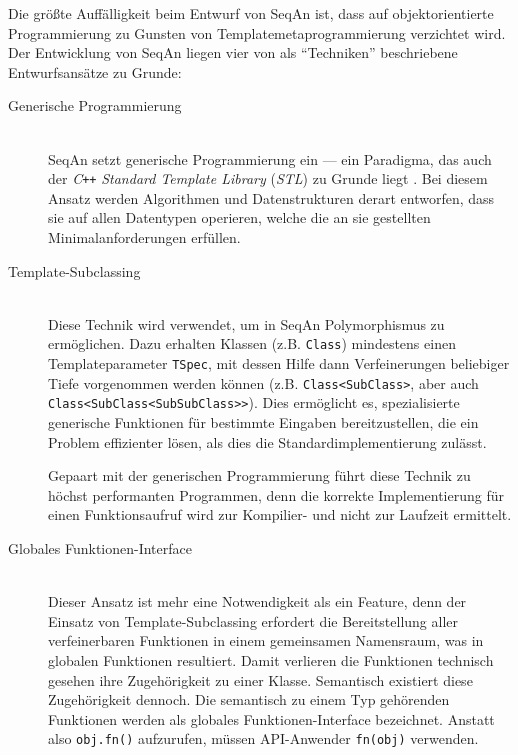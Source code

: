 Die größte Auffälligkeit beim Entwurf von SeqAn ist, dass auf objektorientierte Programmierung zu Gunsten von Templatemetaprogrammierung verzichtet wird. Der Entwicklung von SeqAn liegen vier von \cite{GogolDoring:2009vz} als ``Techniken'' beschriebene Entwurfsansätze zu Grunde:
\begin{description}
  \item[Generische Programmierung] \hfill \\
  SeqAn setzt generische Programmierung ein --- ein Paradigma, das auch der \textit{C{}}\verb!++! \textit{Standard Template Library} (\textit{STL}) zu Grunde liegt \citep{plauger2001c++}. Bei diesem Ansatz werden Algorithmen und Datenstrukturen derart entworfen, dass sie auf allen Datentypen operieren, welche die an sie gestellten Minimalanforderungen erfüllen.
  
  \item[Template-Subclassing] \hfill \\
  Diese Technik wird verwendet, um in SeqAn Polymorphismus zu ermöglichen. Dazu erhalten Klassen (z.B. \texttt{Class}) mindestens einen Templateparameter \texttt{TSpec}, mit dessen Hilfe dann Verfeinerungen beliebiger Tiefe vorgenommen werden können (z.B. \texttt{Class<SubClass>}, aber auch \texttt{Class<SubClass<SubSubClass>>}). Dies ermöglicht es, spezialisierte generische Funktionen für bestimmte Eingaben bereitzustellen, die ein Problem effizienter lösen, als dies die Standardimplementierung zulässt.
  
  Gepaart mit der generischen Programmierung führt diese Technik zu höchst performanten Programmen, denn die korrekte Implementierung für einen Funktionsaufruf wird zur Kompilier- und nicht zur Laufzeit ermittelt.
  
  \item[Globales Funktionen-Interface] \hfill \\
  Dieser Ansatz ist mehr eine Notwendigkeit als ein Feature, denn der Einsatz von Template-Subclassing erfordert die Bereitstellung aller verfeinerbaren Funktionen in einem gemeinsamen Namensraum, was in globalen Funktionen resultiert. Damit verlieren die Funktionen technisch gesehen ihre Zugehörigkeit zu einer Klasse. Semantisch existiert diese Zugehörigkeit dennoch. Die semantisch zu einem Typ gehörenden Funktionen werden als globales Funktionen-Interface bezeichnet. Anstatt also \texttt{obj.fn()} aufzurufen, müssen API-Anwender \texttt{fn(obj)} verwenden.
  

\end{description}
